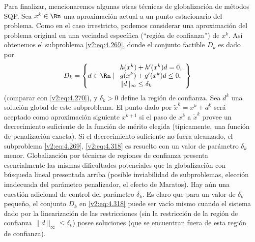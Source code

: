 Para finalizar, mencionaremos algunas otras técnicas de globalización de métodos SQP. Sea $x^k \in \Rn$ una aproximación actual a un punto estacionario del problema. Como en el caso irrestricto, podemos considerar una aproximación del problema original en una vecindad específica (``región de confianza'') de $x^k$. Así obtenemos el subproblema \eqref{v2:eq:4.269}, donde el conjunto factible $D_k$ es dado por
\begin{equation}
D_k = \left\{ d \in \Rn \mid \begin{array}{l} h(x^k) + h'(x^k)d = 0, \\ g(x^k) + g'(x^k)d \le 0, \\ \|d\|_\infty \le \delta_k \end{array} \right\}
\label{v2:eq:4.318}
\end{equation}
(comparar con \eqref{v2:eq:4.270}), y $\delta_k > 0$ define la región de confianza. Sea $d^k$ una solución global de este subproblema. El punto dado por $\tilde{x}^k = x^k + d^k$ será aceptado como aproximación siguiente $x^{k+1}$ si el paso de $x^k$ a $\tilde{x}^k$ provee un decrecimiento suficiente de la función de mérito elegida (típicamente, una función de penalización exacta). Si el decrecimiento suficiente no fuera alcanzado, el subproblema \eqref{v2:eq:4.269}, \eqref{v2:eq:4.318} es resuelto con un valor de parámetro $\delta_k$ menor. Globalización por técnicas de regiones de confianza presenta esencialmente las mismas dificultades potenciales que la globalización con búsqueda lineal presentada arriba (posible inviabilidad de subproblemas, elección inadecuada del parámetro penalizador, el efecto de Maratos). Hay aún una cuestión adicional de control del parámetro $\delta_k$. Es claro que para un valor de $\delta_k$ pequeño, el conjunto $D_k$ en \eqref{v2:eq:4.318} puede ser vacío mismo cuando el sistema dado por la linearización de las restricciones (sin la restricción de la región de confianza $\|d\|_\infty \le \delta_k$) posee soluciones (que se encuentran fuera de esta región de confianza).

